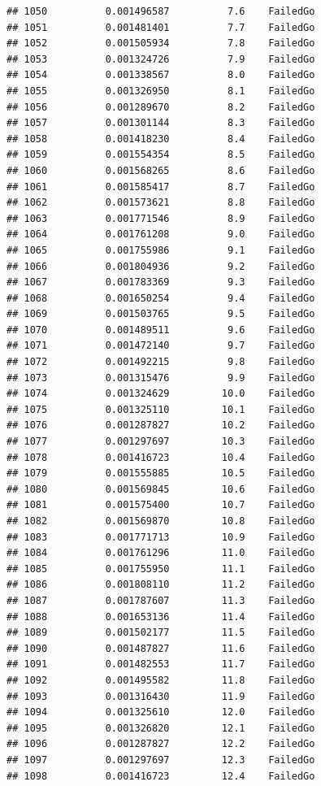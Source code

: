 \documentclass[
]{article}
\begin{document}
\begin{verbatim}
## 1050          0.001496587          7.6    FailedGo
## 1051          0.001481401          7.7    FailedGo
## 1052          0.001505934          7.8    FailedGo
## 1053          0.001324726          7.9    FailedGo
## 1054          0.001338567          8.0    FailedGo
## 1055          0.001326950          8.1    FailedGo
## 1056          0.001289670          8.2    FailedGo
## 1057          0.001301144          8.3    FailedGo
## 1058          0.001418230          8.4    FailedGo
## 1059          0.001554354          8.5    FailedGo
## 1060          0.001568265          8.6    FailedGo
## 1061          0.001585417          8.7    FailedGo
## 1062          0.001573621          8.8    FailedGo
## 1063          0.001771546          8.9    FailedGo
## 1064          0.001761208          9.0    FailedGo
## 1065          0.001755986          9.1    FailedGo
## 1066          0.001804936          9.2    FailedGo
## 1067          0.001783369          9.3    FailedGo
## 1068          0.001650254          9.4    FailedGo
## 1069          0.001503765          9.5    FailedGo
## 1070          0.001489511          9.6    FailedGo
## 1071          0.001472140          9.7    FailedGo
## 1072          0.001492215          9.8    FailedGo
## 1073          0.001315476          9.9    FailedGo
## 1074          0.001324629         10.0    FailedGo
## 1075          0.001325110         10.1    FailedGo
## 1076          0.001287827         10.2    FailedGo
## 1077          0.001297697         10.3    FailedGo
## 1078          0.001416723         10.4    FailedGo
## 1079          0.001555885         10.5    FailedGo
## 1080          0.001569845         10.6    FailedGo
## 1081          0.001575400         10.7    FailedGo
## 1082          0.001569870         10.8    FailedGo
## 1083          0.001771713         10.9    FailedGo
## 1084          0.001761296         11.0    FailedGo
## 1085          0.001755950         11.1    FailedGo
## 1086          0.001808110         11.2    FailedGo
## 1087          0.001787607         11.3    FailedGo
## 1088          0.001653136         11.4    FailedGo
## 1089          0.001502177         11.5    FailedGo
## 1090          0.001487827         11.6    FailedGo
## 1091          0.001482553         11.7    FailedGo
## 1092          0.001495582         11.8    FailedGo
## 1093          0.001316430         11.9    FailedGo
## 1094          0.001325610         12.0    FailedGo
## 1095          0.001326820         12.1    FailedGo
## 1096          0.001287827         12.2    FailedGo
## 1097          0.001297697         12.3    FailedGo
## 1098          0.001416723         12.4    FailedGo

\end{verbatim}
\end{document}
